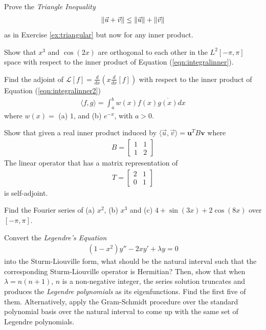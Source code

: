 \begin{Exercise}
\label{ex:triangular2}
Prove the \textit{Triangle Inequality}
\begin{align}
\norm{\vec{u} + \vec{v}} \leq \norm{\vec{u}} + \norm{\vec{v}}
\end{align}
as in Exercise \ref{ex:triangular} but now for any inner product.
\end{Exercise}

\begin{Exercise}
Show that $x^3$ and $\cos(2x)$ are orthogonal to each other in the $L^2[-\pi, \pi]$ space with respect to the inner product of Equation (\ref{eqn:integralinner}).
\end{Exercise}

\begin{Exercise}
Find the adjoint of $\mathcal{L}[f] = \frac{d}{dx}(x\frac{d}{dx}[f])$ with respect to the inner product of Equation (\ref{eqn:integralinner2})
\begin{align*}
\langle f,g \rangle = \int_a^b w(x) f(x) \overline{g(x)} dx    
\end{align*}
where $w(x) =$ (a) $1$, and (b) $e^{-x}$, with $a > 0$.
\end{Exercise}

\begin{Exercise}
Show that given a real inner product induced by $\langle \vec{u},\vec{v} \rangle = \textbf{u}^TB\textbf{v}$ where
\begin{align*}
B = 
\begin{bmatrix}
1 & 1 \\
1 & 2
\end{bmatrix}
\end{align*}
The linear operator that has a matrix representation of
\begin{align*}
T = 
\begin{bmatrix}
2 & 1 \\
0 & 1
\end{bmatrix}
\end{align*}
is self-adjoint.
\end{Exercise}

\begin{Exercise}
Find the Fourier series of (a) $x^2$, (b) $x^3$ and (c) $4+\sin(3x)+2\cos(8x)$ over $[-\pi, \pi]$.
\end{Exercise}

\begin{Exercise}
Convert the \textit{Legendre's Equation}
\begin{align}
(1-x^2) y'' - 2xy' + \lambda y = 0
\end{align}
into the Sturm-Liouville form, what should be the natural interval such that the corresponding Sturm-Liouville operator is Hermitian? Then, show that when $\lambda = n(n+1)$, $n$ is a non-negative integer, the series solution truncates and produces the \textit{Legendre polynomials} as its eigenfunctions. Find the first five of them. Alternatively, apply the Gram-Schmidt procedure over the standard polynomial basis over the natural interval to come up with the same set of Legendre polynomials.
\end{Exercise}